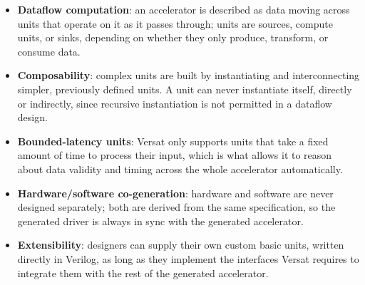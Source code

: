 %

\begin{itemize}
  \itemsep-0.5em
  \item \textbf{Dataflow computation}: an accelerator is described as data
    moving across units that operate on it as it passes through; units are
    sources, compute units, or sinks, depending on whether they only
    produce, transform, or consume data.
  \item \textbf{Composability}: complex units are built by instantiating
    and interconnecting simpler, previously defined units. A unit can never
    instantiate itself, directly or indirectly, since recursive
    instantiation is not permitted in a dataflow design.
  \item \textbf{Bounded-latency units}: Versat only supports units that
    take a fixed amount of time to process their input, which is what
    allows it to reason about data validity and timing across the whole
    accelerator automatically.
  \item \textbf{Hardware/software co-generation}: hardware and software are
    never designed separately; both are derived from the same
    specification, so the generated driver is always in sync with the
    generated accelerator.
  \item \textbf{Extensibility}: designers can supply their own custom basic
    units, written directly in Verilog, as long as they implement the
    interfaces Versat requires to integrate them with the rest of the
    generated accelerator.
\end{itemize}
